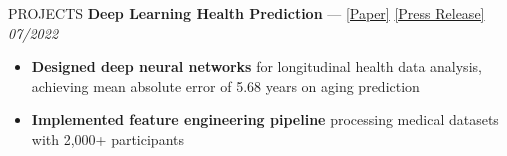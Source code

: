 \documentclass{resume} %
\begin{document}
\begin{rSection}{PROJECTS}
\noindent\textbf{Deep Learning Health Prediction} — 
\href{https://doi.org/10.18632/aging.204264}{[Paper]}
\href{https://www.aging-us.com/news-room/Psychological-factors-substantially-contribute-to-biological-aging-evidence-from-the-aging-rate-in-Chinese-older-adults}{[Press Release]}
\hfill \textit{07/2022}  
\begin{itemize}[leftmargin=*, noitemsep, topsep=2pt]
    \item \textbf{Designed deep neural networks} for longitudinal health data analysis, achieving mean absolute error of 5.68 years on aging prediction
    \item \textbf{Implemented feature engineering pipeline} processing medical datasets with 2,000+ participants

\end{itemize}

\end{rSection}
\end{document}
